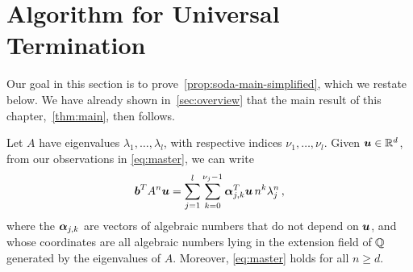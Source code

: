 \section{Algorithm for Universal Termination}
Our goal in this section is to prove~\cref{prop:soda-main-simplified}, which we restate below. We have already shown in~\cref{sec:overview} that the main result of this chapter,~\cref{thm:main}, then follows.

\sodamainsimplified*


Let $A$ have eigenvalues $\lambda_1,\ldots,\lambda_l$, with respective indices $\nu_1,\ldots,\nu_l$. Given $\boldsymbol{u}\in\mathbb{R}^{d}$, from our observations in \cref{eq:master}, we can write
\begin{gather}
\label{eq:master}
\myvector{b}^TA^n\myvector{u} =
\sum_{j=1}^l \sum_{k=0}^{\nu_j-1}
\myvector{\alpha}_{j,k}^T\myvector{u}\, n^k\lambda_j^n \, ,
\end{gather}
where the $\boldsymbol{\alpha}_{j,k}$ are vectors of algebraic numbers
that do not depend on $\boldsymbol{u}$, and whose coordinates are all algebraic numbers lying in the extension field of $\mathbb{Q}$ generated by the eigenvalues of $A$. Moreover, \cref{eq:master} holds for all
$n\geq d$.

